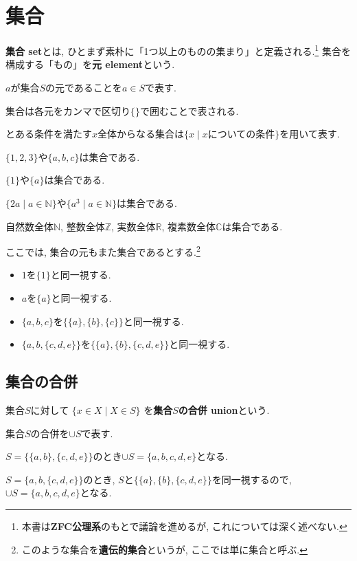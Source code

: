 \section{集合}
{\bf 集合 set}とは, ひとまず素朴に「1つ以上のものの集まり」と定義される.\footnote{本書は{\bf ZFC公理系}のもとで議論を進めるが, これについては深く述べない.} 集合を構成する「もの」を{\bf 元 element}という.
\begin{Notation}
$a$が集合$S$の元であることを$a\in S$で表す.
\end{Notation}
\begin{Notation}
集合は各元をカンマで区切り$\{\}$で囲むことで表される. 
\end{Notation}
\begin{Notation}
とある条件を満たす$x$全体からなる集合は$\{x\mid x\text{についての条件}\}$を用いて表す.
\end{Notation}
\begin{example}$\{1,2,3\}$や$\{a,b,c\}$は集合である. 
\end{example}
\begin{example}$\{1\}$や$\{a\}$は集合である. 
\end{example}
\begin{example}
$\{2a\mid a\in\mathbb{N}\}$や$\{a^3\mid a\in\mathbb{N}\}$は集合である.
\end{example}

\begin{example}
自然数全体$\mathbb{N}$, 整数全体$\mathbb{Z}$, 実数全体$\mathbb{R}$, 複素数全体$\mathbb{C}$は集合である.
\end{example}
\begin{caution}
ここでは, 集合の元もまた集合であるとする.\footnote{このような集合を{\bf 遺伝的集合}というが, ここでは単に集合と呼ぶ.} 
\begin{itemize}
\item 
$1$を$\{1\}$と同一視する.
\item 
$a$を$\{a\}$と同一視する.
\item
$\{a,b,c\}$を$\{\{a\},\{b\},\{c\}\}$と同一視する.
\item 
$\{a,b,\{c,d,e\}\}$を$\{\{a\},\{b\},\{c,d,e\}\}$と同一視する.
\end{itemize}
\end{caution}
\subsection{集合の合併}
\begin{Def}
集合$S$に対して
$\{x\in X\mid X\in S\}$
を{\bf 集合$S$の合併 union}という.
\end{Def}
\begin{Notation}
集合$S$の合併を$\cup S$で表す.
\end{Notation}
\begin{example}
$S=\{\{a,b\},\{c,d,e\}\}$のとき$\cup S=\{a,b,c,d,e\}$となる.
\end{example}
\begin{example}
$S=\{a,b,\{c,d,e\}\}$のとき, $S$と$\{\{a\},\{b\},\{c,d,e\}\}$を同一視するので,
$\cup S=\{a,b,c,d,e\}$となる.
\end{example}
